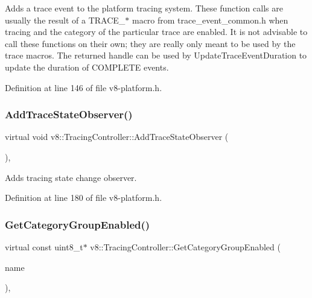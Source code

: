 Adds a trace event to the platform tracing system. These function calls are usually the result of a T\+R\+A\+C\+E\+\_\+$\ast$ macro from trace\+\_\+event\+\_\+common.\+h when tracing and the category of the particular trace are enabled. It is not advisable to call these functions on their own; they are really only meant to be used by the trace macros. The returned handle can be used by Update\+Trace\+Event\+Duration to update the duration of C\+O\+M\+P\+L\+E\+TE events. 

Definition at line 146 of file v8-\/platform.\+h.

\mbox{\label{classv8_1_1TracingController_a7b86361ffadff46018a348fd2aa01061}} 
\subsubsection{\texorpdfstring{Add\+Trace\+State\+Observer()}{AddTraceStateObserver()}}
{\footnotesize\ttfamily virtual void v8\+::\+Tracing\+Controller\+::\+Add\+Trace\+State\+Observer (\begin{DoxyParamCaption}\item[{\mbox{\hyperlink{classv8_1_1TracingController_1_1TraceStateObserver}{Trace\+State\+Observer}} $\ast$}]{ }\end{DoxyParamCaption})\hspace{0.3cm}{\ttfamily [inline]}, {\ttfamily [virtual]}}

Adds tracing state change observer. 

Definition at line 180 of file v8-\/platform.\+h.

\mbox{\label{classv8_1_1TracingController_af3c0fcec8fe93b18a89392686cfedfe5}} 
\subsubsection{\texorpdfstring{Get\+Category\+Group\+Enabled()}{GetCategoryGroupEnabled()}}
{\footnotesize\ttfamily virtual const uint8\+\_\+t$\ast$ v8\+::\+Tracing\+Controller\+::\+Get\+Category\+Group\+Enabled (\begin{DoxyParamCaption}\item[{const char $\ast$}]{name }\end{DoxyParamCaption})\hspace{0.3cm}{\ttfamily [inline]}, {\ttfamily [virtual]}}

